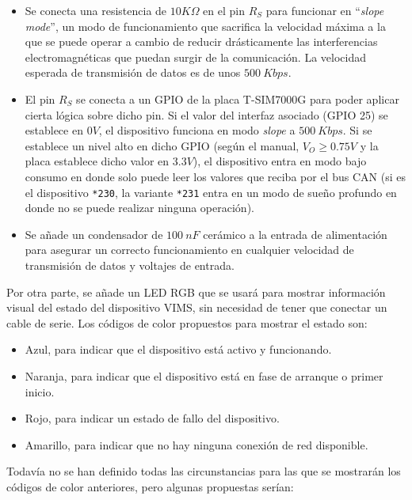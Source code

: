 \begin{itemize}
  \item Se conecta una resistencia de $10K\Omega$ en el pin $R_S$ para funcionar en
        ``\textit{slope mode}'', un modo de funcionamiento que sacrifica la velocidad
        máxima a la que se puede operar a cambio de reducir drásticamente las
        interferencias electromagnéticas que puedan surgir de la comunicación. La
        velocidad esperada de transmisión de datos es de unos $500~Kbps$.
  \item El pin $R_S$ se conecta a un \ac{GPIO} de la placa T-SIM7000G para poder
        aplicar cierta lógica sobre dicho pin. Si el valor del interfaz asociado
        (\ac{GPIO} 25) se establece en $0V$, el dispositivo funciona en modo \textit{slope}
        a $500~Kbps$. Si se establece un nivel alto en dicho \ac{GPIO} (según el manual,
        $V_O \ge 0.75V$ y la placa establece dicho valor en $3.3V$), el dispositivo
        entra en modo bajo consumo en donde solo puede leer los valores que reciba
        por el bus \ac{CAN} (si es el dispositivo \texttt{*230}, la variante
        \texttt{*231} entra en un modo de sueño profundo en donde no se puede realizar
        ninguna operación).
  \item Se añade un condensador de $100~nF$ cerámico a la entrada de alimentación
        para asegurar un correcto funcionamiento en cualquier velocidad de transmisión
        de datos y voltajes de entrada.
\end{itemize}

Por otra parte, se añade un LED RGB que se usará para mostrar información visual
del estado del dispositivo \ac{VIMS}, sin necesidad de tener que conectar un cable
de serie. Los códigos de color propuestos para mostrar el estado son:

\begin{itemize}
  \item Azul, para indicar que el dispositivo está activo y funcionando.
  \item Naranja, para indicar que el dispositivo está en fase de arranque o primer inicio.
  \item Rojo, para indicar un estado de fallo del dispositivo.
  \item Amarillo, para indicar que no hay ninguna conexión de red disponible.
\end{itemize}

Todavía no se han definido todas las circunstancias para las que se mostrarán los
códigos de color anteriores, pero algunas propuestas serían:

